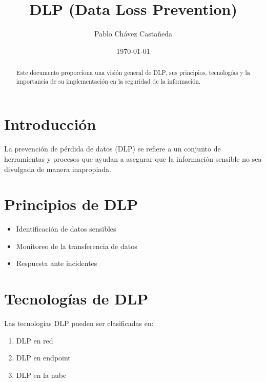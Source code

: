 \documentclass{article}
\title{DLP (Data Loss Prevention)}
\author{Pablo Chávez Castañeda}
\date{\today} %
\begin{document}
	
	\maketitle
	\newpage
	\tableofcontents %
	\newpage
	
	\begin{abstract}
		{Este documento proporciona una visión general de DLP, sus principios, tecnologías y la importancia de su implementación en la seguridad de la información.}
	\end{abstract}
	
	\section{Introducción}
	La prevención de pérdida de datos (DLP) se refiere a un conjunto de herramientas y procesos que ayudan a asegurar que la información sensible no sea divulgada de manera inapropiada.
	
	\section{Principios de DLP}
	\begin{itemize}
		\item Identificación de datos sensibles
		\item Monitoreo de la transferencia de datos
		\item Respuesta ante incidentes
	\end{itemize}
	
	\section{Tecnologías de DLP}
	Las tecnologías DLP pueden ser clasificadas en:
	\begin{enumerate}
		\item DLP en red
		\item DLP en endpoint
		\item DLP en la nube
	\end{enumerate}
	
\end{document}
